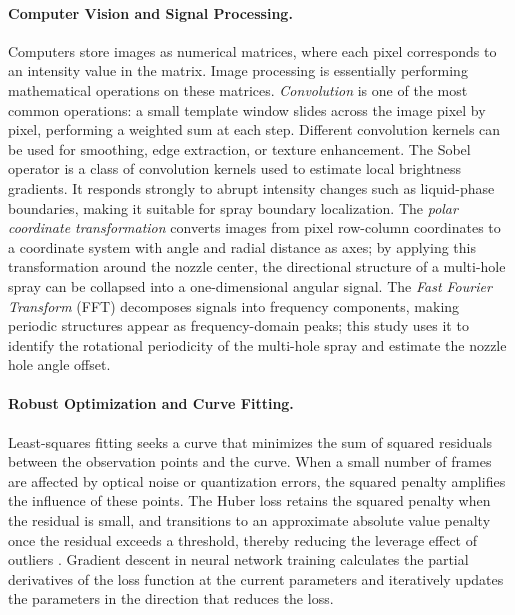\paragraph{Computer Vision and Signal Processing.}
Computers store images as numerical matrices, where each pixel corresponds to an intensity value in the matrix. Image processing is essentially performing mathematical operations on these matrices. \emph{Convolution} is one of the most common operations: a small template window slides across the image pixel by pixel, performing a weighted sum at each step. Different convolution kernels can be used for smoothing, edge extraction, or texture enhancement. The Sobel operator is a class of convolution kernels used to estimate local brightness gradients. It responds strongly to abrupt intensity changes such as liquid-phase boundaries, making it suitable for spray boundary localization. The \emph{polar coordinate transformation} converts images from pixel row-column coordinates to a coordinate system with angle and radial distance as axes; by applying this transformation around the nozzle center, the directional structure of a multi-hole spray can be collapsed into a one-dimensional angular signal. The \emph{Fast Fourier Transform} (FFT) decomposes signals into frequency components, making periodic structures appear as frequency-domain peaks; this study uses it to identify the rotational periodicity of the multi-hole spray and estimate the nozzle hole angle offset.

\paragraph{Robust Optimization and Curve Fitting.}
Least-squares fitting seeks a curve that minimizes the sum of squared residuals between the observation points and the curve. When a small number of frames are affected by optical noise or quantization errors, the squared penalty amplifies the influence of these points. The Huber loss retains the squared penalty when the residual is small, and transitions to an approximate absolute value penalty once the residual exceeds a threshold, thereby reducing the leverage effect of outliers \cite{Huber1964,NocedalWright2006}. Gradient descent in neural network training calculates the partial derivatives of the loss function at the current parameters and iteratively updates the parameters in the direction that reduces the loss.

